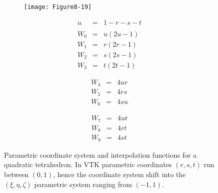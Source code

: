 \begin{description}[leftmargin=0cm,labelindent=0cm]
    \begin{figure}[!htb]
        \centering
        \begin{subfigure}{0.48\linewidth}
            \centering
            \texttt{[image: Figure8-19]}
            \caption*{}
        \end{subfigure}
        \hfill
        \begin{subfigure}{0.48\linewidth}
            \centering
            \begin{equation*}
            \begin{array}{lll}
            u &=& 1 - r - s- t \\ \\
            W_0 &=& u(2u-1) \\
            W_1 &=& r(2r - 1) \\
            W_2 &=& s(2s - 1) \\
            W_3 &=& t (2t - 1)
            \end{array}
            \end{equation*}
            \noindent\begin{minipage}{.5\linewidth}
                \begin{equation*}
                \begin{array}{lll}
                W_4 &=& 4 u r \\
                W_5 &=& 4 r s \\
                W_6 &=& 4 s u
                \end{array}
                \end{equation*}
            \end{minipage}%
            \noindent\begin{minipage}{.5\linewidth}
                \begin{equation*}
                \begin{array}{lll}
                W_7 &=& 4 u t \\
                W_8 &=& 4 r t \\
                W_9 &=& 4 s t
                \end{array}
                \end{equation*}
            \end{minipage}%

        \end{subfigure}%
        \caption{Parametric coordinate system and interpolation functions for a quadratic tetrahedron. In VTK parametric coordinates $(r,s,t)$ run between $(0,1)$, hence the coordinate system shift into the $(\xi, \eta, \zeta)$ parametric system ranging from $(-1,1)$.}
        \label{fig:Figure8-19}
    \end{figure}


\end{description}
